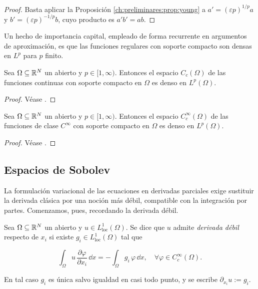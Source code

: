 \begin{proof}
Basta aplicar la Proposición \ref{ch:preliminares:prop:young} a
$a' = (\varepsilon p)^{1/p} a$ y $b' = (\varepsilon p)^{-1/p} b$, cuyo producto es
$a'b' = ab$.
\end{proof}

Un hecho de importancia capital, empleado de forma recurrente en argumentos de
aproximación, es que las funciones regulares con soporte compacto son densas en
$L^p$ para $p$ finito.\\

\begin{Proposicion}[Densidad de $C_c$ en $L^p$]
\label{ch:preliminares:prop:densidadCc}

Sea $\Omega \subseteq \mathbb{R}^N$ un abierto y $p \in [1, \infty)$. Entonces el espacio
$C_c(\Omega)$ de las funciones continuas con soporte compacto en $\Omega$ es denso
en $L^p(\Omega)$.
\end{Proposicion}

\begin{proof}
Véase \cite[Teorema~4.12]{brezis-2011-fun-ana-sob}.
\end{proof}

\begin{Proposicion}
\label{ch:preliminares:prop:densidadCcInf}

Sea $\Omega \subseteq \mathbb{R}^N$ un abierto y $p \in [1, \infty)$. Entonces el espacio
$C_c^\infty(\Omega)$ de las funciones de clase $C^\infty$ con soporte compacto en
$\Omega$ es denso en $L^p(\Omega)$.
\end{Proposicion}

\begin{proof}
Véase \cite[Corolario~4.23]{brezis-2011-fun-ana-sob}.
\end{proof}

\subsection{Espacios de Sobolev}
\label{ch:preliminares:subsection:Sobolev}

La formulación variacional de las ecuaciones en derivadas parciales exige
sustituir la derivada clásica por una noción más débil, compatible con la
integración por partes. Comenzamos, pues, recordando la derivada débil.\\

\begin{Definicion}
\label{ch:preliminares:def:derivadaDebil}

Sea $\Omega \subseteq \mathbb{R}^N$ un abierto y $u \in L^1_{\mathrm{loc}}(\Omega)$. Se
dice que $u$ admite \textit{derivada débil} respecto de $x_i$ si existe
$g_i \in L^1_{\mathrm{loc}}(\Omega)$ tal que

\[\int_\Omega u \, \frac{\partial \varphi}{\partial x_i} \, \dd x = -\int_\Omega g_i \, \varphi \, \dd x, \quad \forall \varphi \in C_c^\infty(\Omega).\]

En tal caso $g_i$ es única salvo igualdad en casi todo punto, y se escribe
$\partial_{x_i} u := g_i$.
\end{Definicion}

